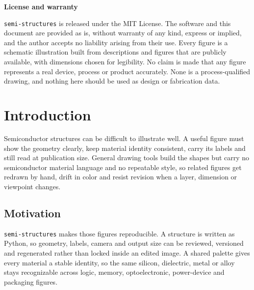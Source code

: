 \documentclass[11pt]{article}
\newcommand{\packagefile}[1]{\texttt{#1}}
\begin{document}
\begin{titlepage}
  \vspace{0.18in}
  \begin{minipage}{0.86\textwidth}
    \scriptsize
    \setlength{\parskip}{0pt}
    \color{slate}
    \begin{center}\textbf{License and warranty}\end{center}
    \vspace{0.05in}
    \packagefile{semi-structures} is released under the MIT License. The
    software and this document are provided as is, without warranty of any
    kind, express or implied, and the author accepts no liability arising
    from their use. Every figure is a schematic illustration built from
    descriptions and figures that are publicly available, with dimensions
    chosen for legibility. No claim is made that any figure represents a
    real device, process or product accurately. None is a process-qualified
    drawing, and nothing here should be used as design or fabrication data.
  \end{minipage}
  \vspace{0.22in}
\end{titlepage}

\setcounter{page}{2}
\tableofcontents
\clearpage
{}

\section{Introduction}

Semiconductor structures can be difficult to illustrate well. A useful figure
must show the geometry clearly, keep material identity consistent, carry its
labels and still read at publication size. General drawing tools build the
shapes but carry no semiconductor material language and no repeatable style,
so related figures get redrawn by hand, drift in color and resist revision
when a layer, dimension or viewpoint changes.

\subsection*{Motivation}

\packagefile{semi-structures} makes those figures reproducible. A structure is
written as Python, so geometry, labels, camera and output size can be
reviewed, versioned and regenerated rather than locked inside an edited
image. A shared palette gives every material a stable identity, so the same
silicon, dielectric, metal or alloy stays recognizable across logic, memory,
optoelectronic, power-device and packaging figures.
\end{document}
